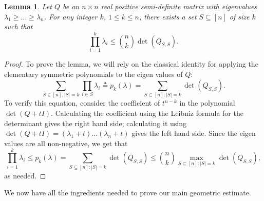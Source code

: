 \documentclass[11pt]{article}
\newtheorem{lemma}{Lemma}
\newcommand{\eqdef}{\triangleq}
\begin{document}
\begin{lemma}\label{lm:rip-det}
  Let $Q$ be an $n\times n$ real positive semi-definite matrix with
  eigenvalues $\lambda_1 \ge \ldots \ge \lambda_n$. For any integer
  $k$, $1 \le k \le n$, there exists a set $S \subseteq [n]$ of size $k$
  such that
  \[\prod_{i=1}^k \lambda_i \leq \binom{n}{k} \det(Q_{S,S}).\]
\end{lemma}
\begin{proof}
To prove the lemma, we will rely on the classical identity for applying the
elementary symmetric polynomials to the eigen values of $Q$:
\begin{equation*}
\sum_{S \in [n],|S|=k} \prod_{i \in S} \lambda_i \eqdef p_k(\lambda) = \sum_{S \subset [n]: |S| = k}\det(Q_{S,S}).
\end{equation*}
To verify this equation, consider the coefficient of $t^{n-k}$ in the polynomial
$\det(Q + tI)$. Calculating the coefficient using the Leibniz formula for the
determinant gives the right hand side; calculating it using $\det(Q + tI) =
(\lambda_1 + t)\ldots(\lambda_n + t)$ gives the left hand side. Since the eigen
values are all non-negative, we get that
\[
\prod_{i=1}^k \lambda_i \leq p_k(\lambda) =  
 \sum_{S \subseteq [n]: |S|=k} \det(Q_{S,S}) \leq \binom{n}{k} \max_{S
\subseteq [n]: |S|=k} \det(Q_{S,S}),
\]
as needed.
\end{proof}

We now have all the ingredients needed to prove our main geometric estimate.
\end{document}

